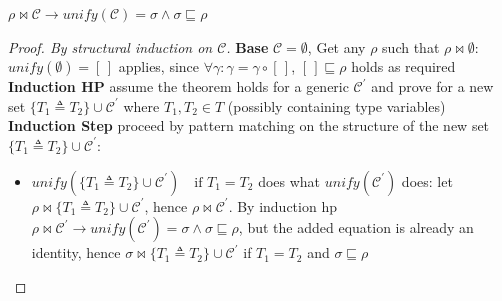 \documentclass[8pt]{beamer}
\begin{document}
\begin{frame}
    \begin{theorem}
        $\rho \Join \mathcal{C} \rightarrow unify(\mathcal{C}) = \sigma \wedge 
            \sigma \sqsubseteq \rho$
    \end{theorem}
    \footnotesize
    \begin{proof}[Proof. By structural induction on $\mathcal{C}$]
    \textbf{Base} $\mathcal{C} = \emptyset$, 
        Get any $\rho$ such that $\rho \Join \emptyset$:
        $unify(\emptyset) = [\,]$ applies, since 
        $\forall\gamma: \gamma = \gamma \circ [\,]$, 
        $[\,] \sqsubseteq \rho$ holds as required\\
    \textbf{Induction HP} assume the theorem holds for a generic
        $\mathcal{C}^{\prime}$ and prove for a new set 
        $\{T_1 \triangleq T_2\} \cup \mathcal{C}^{\prime}$
        where $T_1,T_2 \in T$ (possibly containing type variables) \\
    \textbf{Induction Step} proceed by pattern matching on the 
        structure of the new set $\{T_1 \triangleq T_2\} \cup 
        \mathcal{C}^{\prime}$: 
        \begin{itemize}
            \item $unify(\{T_1 \triangleq T_2\} \cup 
                \mathcal{C}^{\prime})
                \quad \text{if } T_1 = T_2$ does what 
                $unify(\mathcal{C}^{\prime})$ does: let $\rho \Join
                \{T_1 \triangleq T_2\} \cup 
                \mathcal{C}^{\prime}$, hence $\rho \Join
                \mathcal{C}^{\prime}$. By induction hp 
                $\rho \Join \mathcal{C}^{\prime} \rightarrow
                unify(\mathcal{C}^{\prime}) = \sigma \wedge
                \sigma \sqsubseteq \rho$, but the added equation
                is already an identity, hence $\sigma \Join 
                \{T_1 \triangleq T_2\} \cup \mathcal{C}^{\prime}$ 
                if $ T_1 = T_2$ and $\sigma \sqsubseteq \rho$


\end{itemize}
\end{proof}
\end{frame}
\end{document}
